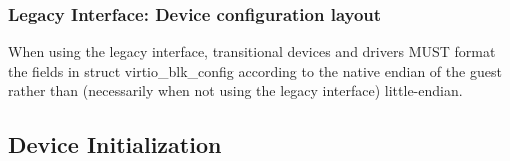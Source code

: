 \subsubsection{Legacy Interface: Device configuration layout}\label{sec:Device Types / Block Device / Device configuration layout / Legacy Interface: Device configuration layout}
When using the legacy interface, transitional devices and drivers
MUST format the fields in struct virtio_blk_config
according to the native endian of the guest rather than
(necessarily when not using the legacy interface) little-endian.


\subsection{Device Initialization}\label{sec:Device Types / Block Device / Device Initialization}


